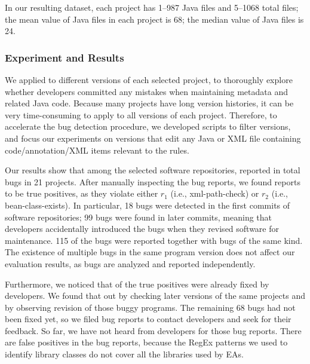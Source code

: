 In our resulting dataset, each project has 1--987 Java files and 5--1068 total files; the mean value of Java files in each project is 68; the median value of Java files is 24.


\subsubsection{Experiment and Results}\label{sec:real-setting}

We applied \tool to different versions of each selected project, to thoroughly explore whether developers committed any mistakes when maintaining metadata and related Java code. Because many projects have long version histories, it can be very time-consuming to apply \tool to all versions of each project. 
Therefore, to accelerate the bug detection procedure, we developed scripts to filter versions, and focus our experiments on versions that edit any Java or XML file containing code/annotation/XML items relevant to the \totalRule rules. 

Our results show that among the selected \totalRealProject software repositories, \tool reported in total \totalReportedInReal bugs in 21 projects. After manually inspecting the bug reports, we found \totalInteresting reports to be true positives, as they violate either $r_1$ (i.e., xml-path-check) or $r_2$ (i.e., bean-class-exists).   
{In particular, 18 bugs were detected in the first commits of software repositories; %
{99} bugs were found in later commits, meaning that developers accidentally introduced the bugs when they revised software for maintenance.}
{115 of the \totalInteresting bugs were reported together with bugs of the same kind. The existence of multiple bugs in the same program version does not affect our evaluation results, as bugs are analyzed and reported independently. }

{Furthermore, we noticed that \totalRealBugs of the \totalInteresting true positives were already fixed by developers. We found that out by checking later versions of the same projects and by observing revision of those buggy programs.} The remaining 68 bugs had not been fixed yet, so we filed bug reports to contact developers and seek for their feedback. So far, we have not heard from developers for those bug reports.
There are \totalFalsePositives false positives in the \totalReportedInReal bug reports, because the RegEx patterns we used to identify library classes do not cover all the libraries used by EAs.

